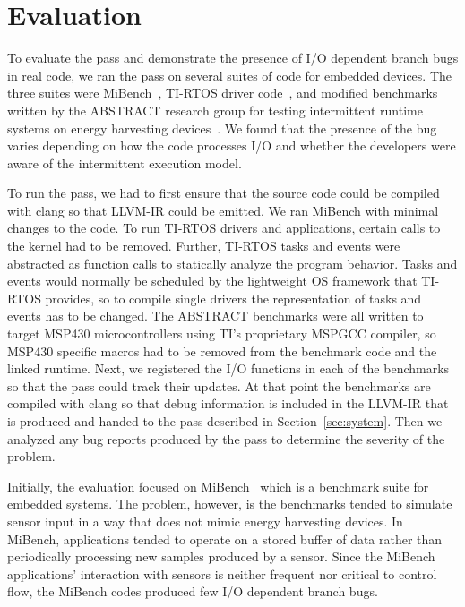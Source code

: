 \section{Evaluation}
%
%
To evaluate the pass and demonstrate the presence of I/O dependent branch
bugs in real code, we ran the pass on several suites of code for embedded
devices. The three suites were MiBench~\cite{mibench}, TI-RTOS driver
code~\cite{tirtos}, and modified benchmarks written by the ABSTRACT research
group for testing intermittent runtime systems on energy harvesting
devices~\cite{alpaca,chain,dino,capybara}.  We found that the presence of the
bug varies depending on how the code processes I/O and whether the developers
were aware of the intermittent execution model.

To run the pass, we had to first ensure that the source code could be compiled
with clang so that LLVM-IR could be emitted. We ran MiBench with minimal changes
to the code.
%
To run TI-RTOS drivers and applications, certain calls to the kernel had to be
removed. Further, TI-RTOS tasks and events were abstracted as function calls
to statically analyze the program behavior. Tasks and events would normally be
scheduled by the lightweight OS framework that TI-RTOS provides, so to compile
single drivers the representation of tasks and events has to be changed.
%
The ABSTRACT benchmarks were all written to target MSP430 microcontrollers using
TI's proprietary MSPGCC compiler, so MSP430 specific macros had to be removed
from the benchmark code and the linked runtime.
%
Next, we registered the I/O functions in each of the benchmarks so that the pass
could track their updates. At that point the benchmarks are compiled with
clang so that debug information is included in the LLVM-IR that is produced and
handed to the pass described in Section~\ref{sec:system}. Then we analyzed any
bug reports produced by the pass to determine the severity of the problem.

Initially, the evaluation focused on MiBench~\cite{mibench} which is a benchmark
suite for embedded systems. The problem, however, is the benchmarks tended to
simulate sensor input in a way that does not mimic energy harvesting devices. In
MiBench, applications tended to operate on a stored buffer of data rather than
periodically processing new samples produced by a sensor. Since the MiBench
applications' interaction with sensors is neither frequent nor critical to
control flow, the MiBench codes produced few I/O dependent branch bugs.

